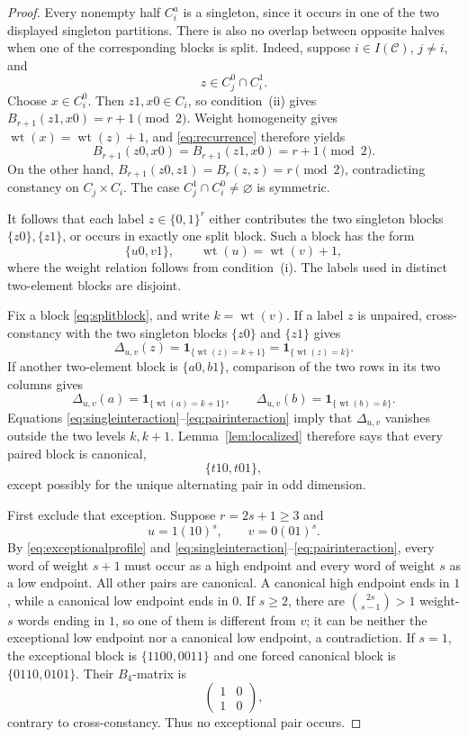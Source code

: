 \documentclass[11pt]{article}
\theoremstyle{definition}
\newcommand{\wt}{\operatorname{wt}}
\newcommand{\ind}[1]{\mathbf 1_{\{#1\}}}
\newcommand{\bits}{\{0,1\}}
\begin{document}
\begin{proof}
Every nonempty half $C_i^a$ is a singleton, since it occurs in one of the two displayed singleton partitions.  There is also no overlap between opposite halves when one of the corresponding blocks is split.  Indeed, suppose $i\in I(\mathcal C)$, $j\ne i$, and
\[
 z\in C_j^0\cap C_i^1.
\]
Choose $x\in C_i^0$.  Then $z1,x0\in C_i$, so condition~(ii) gives
$B_{r+1}(z1,x0)=r+1\pmod2$.  Weight homogeneity gives
$\wt(x)=\wt(z)+1$, and \eqref{eq:recurrence} therefore yields
\[
 B_{r+1}(z0,x0)=B_{r+1}(z1,x0)=r+1\pmod2.
\]
On the other hand,
$B_{r+1}(z0,z1)=B_r(z,z)=r\pmod2$, contradicting constancy on
$C_j\times C_i$.  The case $C_j^1\cap C_i^0\ne\varnothing$ is symmetric.

It follows that each label $z\in\bits^r$ either contributes the two singleton blocks $\{z0\},\{z1\}$, or occurs in exactly one split block.  Such a block has the form
\begin{equation}\label{eq:splitblock}
 \{u0,v1\},\qquad \wt(u)=\wt(v)+1,
\end{equation}
where the weight relation follows from condition~(i).  The labels used in distinct two-element blocks are disjoint.

Fix a block \eqref{eq:splitblock}, and write $k=\wt(v)$.  If a label $z$ is unpaired, cross-constancy with the two singleton blocks $\{z0\}$ and $\{z1\}$ gives
\begin{equation}\label{eq:singleinteraction}
 \Delta_{u,v}(z)=\ind{\wt(z)=k+1}
                 =\ind{\wt(z)=k}.
\end{equation}
If another two-element block is $\{a0,b1\}$, comparison of the two rows in its two columns gives
\begin{equation}\label{eq:pairinteraction}
 \Delta_{u,v}(a)=\ind{\wt(a)=k+1},
 \qquad
 \Delta_{u,v}(b)=\ind{\wt(b)=k}.
\end{equation}
Equations \eqref{eq:singleinteraction}--\eqref{eq:pairinteraction} imply that $\Delta_{u,v}$ vanishes outside the two levels $k,k+1$.  Lemma~\ref{lem:localized} therefore says that every paired block is canonical,
\[
 \{t10,t01\},
\]
except possibly for the unique alternating pair in odd dimension.

First exclude that exception.  Suppose $r=2s+1\ge3$ and
\[
 u=1(10)^s,\qquad v=0(01)^s.
\]
By \eqref{eq:exceptionalprofile} and \eqref{eq:singleinteraction}--\eqref{eq:pairinteraction}, every word of weight $s+1$ must occur as a high endpoint and every word of weight $s$ as a low endpoint.  All other pairs are canonical.  A canonical high endpoint ends in $1$, while a canonical low endpoint ends in $0$.  If $s\ge2$, there are $\binom{2s}{s-1}>1$ weight-$s$ words ending in $1$, so one of them is different from $v$; it can be neither the exceptional low endpoint nor a canonical low endpoint, a contradiction.  If $s=1$, the exceptional block is $\{1100,0011\}$ and one forced canonical block is $\{0110,0101\}$.  Their $B_4$-matrix is
\[
 \begin{pmatrix}1&0\\1&0\end{pmatrix},
\]
contrary to cross-constancy.  Thus no exceptional pair occurs.


\end{proof}
\end{document}
